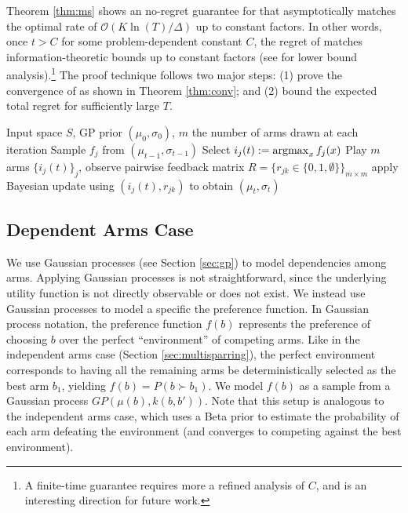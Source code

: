 Theorem \ref{thm:ms} shows an no-regret guarantee for \multisparring that asymptotically matches the optimal rate of $\mathcal{O}(K\ln(T)/\Delta)$ up to constant factors. In other words, once $t>C$ for some problem-dependent constant $C$, the regret of \multisparring matches information-theoretic bounds up to constant factors (see \citet{yue2012k} for lower bound analysis).\footnote{A finite-time guarantee requires more a refined analysis of $C$, and is an interesting direction for future work.}
The proof technique follows two major steps:
(1) prove the convergence of \multisparring as shown in Theorem \ref{thm:conv}; and
(2) bound the expected total regret for sufficiently large $T$.



 \begin{algorithm}[tb]
     \caption{\kersparring}
     \label{alg:ks}
 \begin{algorithmic}[1]
 	 \INPUT Input space $S$, GP prior $(\mu_0, \sigma_0)$, $m$ the number of arms drawn at each iteration   
          \STATE Sample $f_j$ from $(\mu_{t-1}, \sigma_{t-1})$
          \STATE Select $i_j(t) := \argmax_x{f_j(x)}$
    	\ENDFOR
        \STATE Play $m$ arms $\{i_j(t)\}_j$, observe pairwise feedback matrix $R = \{r_{jk} \in \{0,1,\emptyset\}\}_{m \times m}$
          \STATE apply Bayesian update using $(i_j(t), r_{jk})$ to obtain $(\mu_t, \sigma_t)$
          \ENDIF
        \ENDFOR
     \ENDFOR
 \end{algorithmic}
 \end{algorithm}


\subsection{Dependent Arms Case}
We use Gaussian processes (see Section \ref{sec:gp}) to model dependencies among arms. 
Applying Gaussian processes is not straightforward, since the underlying utility function is not directly observable or does not exist. 
We instead use Gaussian processes to model a specific the preference function. In Gaussian process notation, the preference function $f(b)$ represents the preference of choosing $b$ over the perfect ``environment'' of competing arms. Like in the independent arms case (Section \ref{sec:multisparring}), the perfect environment corresponds to having all the remaining arms be deterministically selected as the best arm $b_1$, yielding $f(b) = P(b \succ b_1)$. We model $f(b)$ as a sample from a Gaussian process $GP(\mu(b),k(b, b'))$. Note that this setup is analogous to the independent arms case, which uses a Beta prior to estimate the probability of each arm defeating the environment (and converges to competing against the best environment). %

